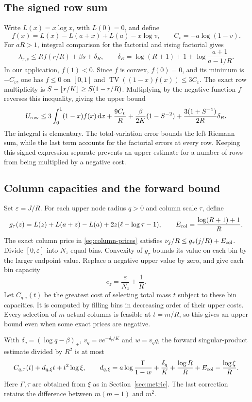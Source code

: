\subsection{The signed row sum}
Write $L(x)=x\log x$, with $L(0)=0$, and define
\[
 f(x)=L(x)-L(a+x)+L(a)-x\log v,
 \qquad C_v=-a\log(1-v).
\]
For $aR>1$, integral comparison for the factorial and rising factorial gives
\[
 \lambda_{r,s}\leq Rf(r/R)+\beta s+\delta_R,
 \qquad
 \delta_R=\log(R+1)+1+\log\frac{a+1}{a-1/R}.
\]
In our application, $f(1)<0$. Since $f$ is convex, $f(0)=0$, and its minimum is $-C_v$, one has $f\leq0$ on $[0,1]$ and
$\operatorname{TV}((1-x)f(x))\leq3C_v$. The exact row multiplicity is
$S-\left\lfloor r/K\right\rfloor\geq S(1-r/R)$. Multiplying by the negative function $f$ reverses this inequality, giving the upper bound
\begin{equation}\label{eq:row-finite}
 U_{\rm row}\leq
 3\int_0^1(1-x)f(x)\,\mathrm dx+\frac{9C_v}{R}
 +\frac\beta{2K}(1-S^{-2})
 +\frac{3(1+S^{-1})}{2R}\delta_R.
\end{equation}
The integral is elementary. The total-variation error bounds the left Riemann sum, while the last term accounts for the factorial errors at every row. Keeping this signed expression separate prevents an upper estimate for a number of rows from being multiplied by a negative cost.

\subsection{Column capacities and the forward bound}
Set $\varepsilon=J/R$. For each upper node radius $q>0$ and column scale $\tau$, define
\[
 g_\tau(z)=L(z)+L(a+z)-L(a)
          +2z(\ell-\log\tau-1),\qquad
 E_{\rm col}=\frac{\log(R+1)+1}{R}.
\]
The exact column price in \eqref{eq:column-prices} satisfies
$\nu_j/R\leq g_\tau(j/R)+E_{\rm col}$. Divide $[0,\varepsilon]$ into $N_z$ equal bins. Convexity of $g_\tau$ bounds its value on each bin by the larger endpoint value. Replace a negative upper value by zero, and give each bin capacity
\[
 c_z=\frac{\varepsilon}{N_z}+\frac1R.
\]
Let $C_{q,\tau}(t)$ be the greatest cost of selecting total mass $t$ subject to these bin capacities. It is computed by filling bins in decreasing order of their upper costs. Every selection of $m$ actual columns is feasible at $t=m/R$, so this gives an upper bound even when some exact prices are negative.

With $\delta_q=(\log q-\beta)_+$, $v_q=ve^{-\delta_q/K}$ and $w=v_qq$, the forward singular-product estimate divided by $R^2$ is at most
\begin{equation}\label{eq:forward-finite}
 C_{q,\tau}(t)+d_{q,\xi}t+t^2\log\xi,
 \qquad
 d_{q,\xi}=a\log\frac\Gamma{1-w}+\frac{\delta_q}{K}
 +\frac{\log R}{R}+E_{\rm col}-\frac{\log\xi}{R}.
\end{equation}
Here $\Gamma,\tau$ are obtained from $\xi$ as in Section~\ref{sec:metric}. The last correction retains the difference between $m(m-1)$ and $m^2$.


